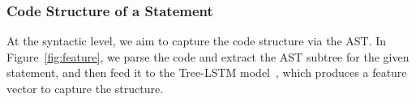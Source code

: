 
\vspace{-1pt}
\subsubsection{Code Structure of a Statement}

At the syntactic level, we aim to capture the code structure via the
AST. In Figure~\ref{fig:feature}, we parse the code and extract the
AST subtree for the given statement, and then feed it to the Tree-LSTM
model~\cite{tai2015improved}, which produces a feature vector to
capture the structure.





%

